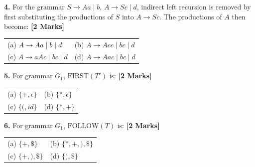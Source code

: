 \documentclass[11pt,a4paper]{article}
\begin{document}
\vspace{0.22cm}

\noindent \textbf{4.} For the grammar $S \rightarrow Aa \mid b$, \quad $A \rightarrow Sc \mid d$, indirect left recursion is removed by first substituting the productions of $S$ into $A \rightarrow Sc$. The productions of $A$ then become: \hfill \textbf{[2 Marks]}
\vspace{0.06cm}
\noindent
\begin{tabularx}{\textwidth}{@{}X X@{}}
(a) $A \rightarrow Aa \mid b \mid d$ & (b) $A \rightarrow Acc \mid bc \mid d$ \\[3pt]
(c) $A \rightarrow aAc \mid bc \mid d$ & (d) $A \rightarrow Aac \mid bc \mid d$ \\
\end{tabularx}

\vspace{0.22cm}

\noindent \textbf{5.} For grammar $G_1$, $\text{FIRST}(T')$ is: \hfill \textbf{[2 Marks]}
\vspace{0.06cm}
\noindent
\begin{tabularx}{\textwidth}{@{}X X@{}}
(a) $\{+, \epsilon\}$ & (b) $\{*, \epsilon\}$ \\[3pt]
(c) $\{(, id\}$ & (d) $\{*, +\}$ \\
\end{tabularx}

\vspace{0.22cm}

\noindent \textbf{6.} For grammar $G_1$, $\text{FOLLOW}(T)$ is: \hfill \textbf{[2 Marks]}
\vspace{0.06cm}
\noindent
\begin{tabularx}{\textwidth}{@{}X X@{}}
(a) $\{+, \$\}$ & (b) $\{*, +, ), \$\}$ \\[3pt]
(c) $\{+, ), \$\}$ & (d) $\{), \$\}$ \\
\end{tabularx}

\vspace{0.22cm}
\end{document}
